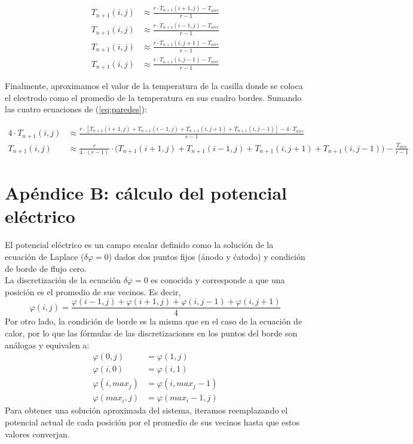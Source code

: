 \documentclass[a4paper]{article}
\begin{document}
\begin{equation*} \label{eq:paredes}
\begin{aligned}
T_{n+1}(i,j) & \approx \frac{r \cdot T_{n+1}(i+1,j) - T_{aire}}{r-1} \\
T_{n+1}(i,j) & \approx \frac{r \cdot T_{n+1}(i-1,j) - T_{aire}}{r-1} \\
T_{n+1}(i,j) & \approx \frac{r \cdot T_{n+1}(i,j+1) - T_{aire}}{r-1} \\
T_{n+1}(i,j) & \approx \frac{r \cdot T_{n+1}(i,j-1) - T_{aire}}{r-1}
\end{aligned}
\end{equation*}

Finalmente, aproximamos el valor de la temperatura de la casilla donde se coloca el electrodo como el promedio de la temperatura en sus cuadro bordes. Sumando las cuatro ecuaciones de (\ref{eq:paredes}):

\begin{equation*}
\begin{aligned}
4 \cdot T_{n+1}(i,j) & \approx \frac{r \cdot [T_{n+1}(i+1,j) + T_{n+1}(i-1,j) + T_{n+1}(i,j+1) + T_{n+1}(i,j-1)] - 4 \cdot T_{aire}}{r-1} \\
T_{n+1}(i,j) & \approx \frac{r}{4 \cdot (r-1)} \cdot \big(T_{n+1}(i+1,j) + T_{n+1}(i-1,j) + T_{n+1}(i,j+1) + T_{n+1}(i,j-1)\big) - \frac{T_{aire}}{r-1}
\end{aligned}
\end{equation*}

\newpage
\section{Apéndice B: cálculo del potencial eléctrico}

El potencial eléctrico es un campo escalar definido como la solución de la ecuación de Laplace ($\delta \varphi = 0$) dados dos puntos fijos (ánodo y ćatodo) y condición de borde de flujo cero.\\
La discretización de la ecuación $\delta \varphi = 0$ es conocida y corresponde a que una posición es el promedio de sus vecinos. Es decir, $$\varphi(i, j) = \frac{\varphi(i-1, j) + \varphi(i+1, j) + \varphi(i, j-1) + \varphi(i, j+1)}{4}$$
Por otro lado, la condición de borde es la misma que en el caso de la ecuación de calor, por lo que las fórmulas de las discretizaciones en los puntos del borde son análogas y equivalen a:
\begin{equation*}
\begin{aligned}
\varphi(0,j) & = \varphi(1,j) \\ 
\varphi(i,0) & = \varphi(i,1) \\
\varphi(i,max_j) & = \varphi(i,max_j-1) \\ 
\varphi(max_i,j) & = \varphi(max_i-1,j)
\end{aligned}
\end{equation*}
Para obtener una solución aproximada del sistema, iteramos reemplazando el potencial actual de cada posición por el promedio de sus vecinos hasta que estos valores converjan.
\end{document}
